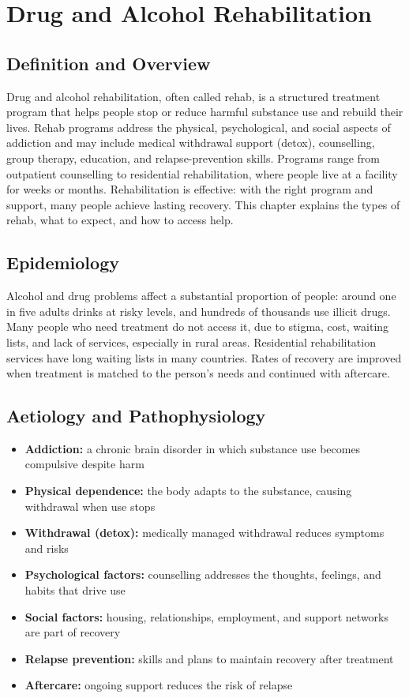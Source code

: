 \chapter{Drug and Alcohol Rehabilitation}

\section*{Definition and Overview}
Drug and alcohol rehabilitation, often called rehab, is a structured treatment program that helps people stop or reduce harmful substance use and rebuild their lives. Rehab programs address the physical, psychological, and social aspects of addiction and may include medical withdrawal support (detox), counselling, group therapy, education, and relapse-prevention skills. Programs range from outpatient counselling to residential rehabilitation, where people live at a facility for weeks or months. Rehabilitation is effective: with the right program and support, many people achieve lasting recovery. This chapter explains the types of rehab, what to expect, and how to access help.

\section*{Epidemiology}
Alcohol and drug problems affect a substantial proportion of people: around one in five adults drinks at risky levels, and hundreds of thousands use illicit drugs. Many people who need treatment do not access it, due to stigma, cost, waiting lists, and lack of services, especially in rural areas. Residential rehabilitation services have long waiting lists in many countries. Rates of recovery are improved when treatment is matched to the person's needs and continued with aftercare.

\section*{Aetiology and Pathophysiology}
\begin{itemize}
    \item \textbf{Addiction:} a chronic brain disorder in which substance use becomes compulsive despite harm
    \item \textbf{Physical dependence:} the body adapts to the substance, causing withdrawal when use stops
    \item \textbf{Withdrawal (detox):} medically managed withdrawal reduces symptoms and risks
    \item \textbf{Psychological factors:} counselling addresses the thoughts, feelings, and habits that drive use
    \item \textbf{Social factors:} housing, relationships, employment, and support networks are part of recovery
    \item \textbf{Relapse prevention:} skills and plans to maintain recovery after treatment
    \item \textbf{Aftercare:} ongoing support reduces the risk of relapse
\end{itemize}

